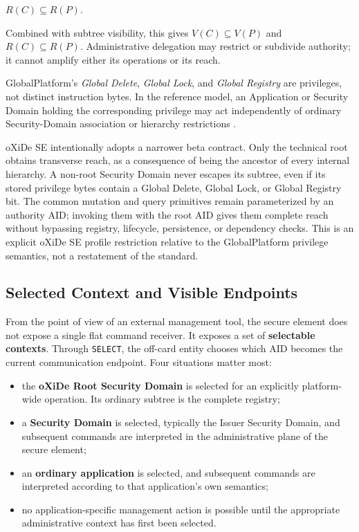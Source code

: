 \begin{center}
$R(C) \subseteq R(P)$.
\end{center}

Combined with subtree visibility, this gives
$V(C) \subseteq V(P)$ and $R(C) \subseteq R(P)$. Administrative delegation
may restrict or subdivide authority; it cannot amplify either its operations
or its reach.

GlobalPlatform's \emph{Global Delete}, \emph{Global Lock}, and
\emph{Global Registry} are privileges, not distinct instruction bytes. In the
reference model, an Application or Security Domain holding the corresponding
privilege may act independently of ordinary Security-Domain association or
hierarchy restrictions .

oXiDe SE intentionally adopts a narrower beta contract. Only the technical
root obtains transverse reach, as a consequence of being the ancestor of every
internal hierarchy. A non-root Security Domain never escapes its subtree, even
if its stored privilege bytes contain a Global Delete, Global Lock, or Global
Registry bit. The common mutation and query primitives remain parameterized by
an authority AID; invoking them with the root AID gives them complete reach
without bypassing registry, lifecycle, persistence, or dependency checks. This
is an explicit oXiDe SE profile restriction relative to the GlobalPlatform
privilege semantics, not a restatement of the standard.

\subsection{Selected Context and Visible Endpoints}
\label{sec:gp-selected-context}


From the point of view of an external management tool, the secure
element does not expose a single flat command receiver. It exposes a set
of \textbf{selectable contexts}. Through \texttt{SELECT}, the off-card
entity chooses which AID becomes the current communication endpoint. Four
situations matter most:

\begin{itemize}
\item the \textbf{oXiDe Root Security Domain} is selected for an explicitly
  platform-wide operation. Its ordinary subtree is the complete registry;
\item a \textbf{Security Domain} is selected, typically the Issuer
  Security Domain, and subsequent commands are interpreted in the
  administrative plane of the secure element;
\item an \textbf{ordinary application} is selected, and subsequent
  commands are interpreted according to that application's own semantics;
\item no application-specific management action is possible until the
  appropriate administrative context has first been selected.
\end{itemize}

